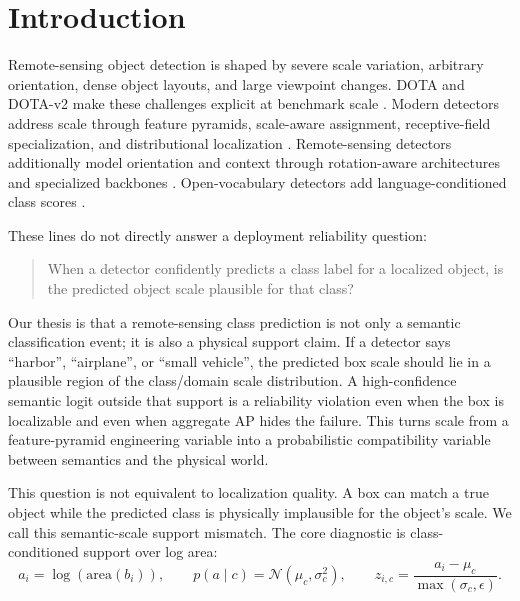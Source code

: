\documentclass[10pt]{article}
\begin{document}
\section{Introduction}

Remote-sensing object detection is shaped by severe scale variation, arbitrary
orientation, dense object layouts, and large viewpoint changes.  DOTA and
DOTA-v2 make these challenges explicit at benchmark scale
\cite{xia2017dota,ding2021dotav2}.  Modern detectors address scale through
feature pyramids, scale-aware assignment, receptive-field specialization, and
distributional localization \cite{lin2016fpn,li2019tridentnet,tian2019fcos,zhang2019atss,li2020gfl}.
Remote-sensing detectors additionally model orientation and context through
rotation-aware architectures and specialized backbones
\cite{han2020s2anet,han2021redet,yu2023h2rboxv2,li2024lsknet}.
Open-vocabulary detectors add language-conditioned class scores
\cite{gu2021vild,li2021glip,minderer2022owlvit,liu2023groundingdino,zhou2022detic,cheng2024yoloworld,pan2024laedino,huang2025openrsd}.

These lines do not directly answer a deployment reliability question:

\begin{quote}
When a detector confidently predicts a class label for a localized object, is
the predicted object scale plausible for that class?
\end{quote}

Our thesis is that a remote-sensing class prediction is not only a semantic
classification event; it is also a physical support claim.  If a detector says
``harbor'', ``airplane'', or ``small vehicle'', the predicted box scale should
lie in a plausible region of the class/domain scale distribution.  A
high-confidence semantic logit outside that support is a reliability violation
even when the box is localizable and even when aggregate AP hides the failure.
This turns scale from a feature-pyramid engineering variable into a
probabilistic compatibility variable between semantics and the physical world.

This question is not equivalent to localization quality.  A box can match a
true object while the predicted class is physically implausible for the object's
scale.  We call this semantic-scale support mismatch.  The core diagnostic is
class-conditioned support over log area:
\begin{equation}
  a_i = \log(\mathrm{area}(b_i)), \qquad
  p(a\mid c) = \mathcal{N}(\mu_c,\sigma_c^2), \qquad
  z_{i,c} = \frac{a_i-\mu_c}{\max(\sigma_c,\epsilon)}.
\end{equation}
\end{document}
